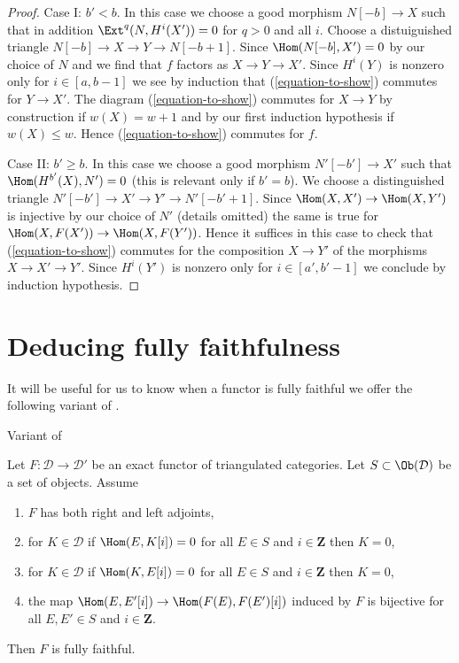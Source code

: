 \begin{proof}
\medskip\noindent
Case I: $b' < b$. In this case we choose a good morphism
$N[-b] \to X$ such that in addition $\Ext^q(N, H^i(X')) = 0$
for $q > 0$ and all $i$. Choose a distuiguished triangle
$N[-b] \to X \to Y \to N[-b + 1]$. Since
$\Hom(N[-b], X') = 0$ by our choice of $N$ and we find that $f$ factors
as $X \to Y \to X'$. Since $H^i(Y)$ is nonzero only for $i \in [a, b - 1]$
we see by induction that (\ref{equation-to-show}) commutes for
$Y \to X'$. The diagram (\ref{equation-to-show}) commutes for
$X \to Y$ by construction if $w(X) = w + 1$ and by our first
induction hypothesis if $w(X) \leq w$.
Hence (\ref{equation-to-show}) commutes for $f$.

\medskip\noindent
Case II: $b' \geq b$. In this case we choose a good morphism
$N'[-b'] \to X'$ such that $\Hom(H^{b'}(X), N') = 0$ (this is
relevant only if $b' = b$). We choose a distinguished triangle
$N'[-b'] \to X' \to Y' \to N'[-b' + 1]$. Since
$\Hom(X, X') \to \Hom(X, Y')$ is injective by our choice of $N'$
(details omitted) the same is true for
$\Hom(X, F(X')) \to \Hom(X, F(Y'))$.
Hence it suffices in this case to check that
(\ref{equation-to-show}) commutes for the composition $X \to Y'$
of the morphisms $X \to X' \to Y'$.
Since $H^i(Y')$ is nonzero only for $i \in [a', b' - 1]$
we conclude by induction hypothesis.
\end{proof}










\section{Deducing fully faithfulness}
\label{section-get-fully-faithful}

\noindent
It will be useful for us to know when a functor is fully faithful
we offer the following variant of \cite[Lemma 2.15]{Orlov-K3}.

\begin{lemma}
\label{lemma-get-fully-faithful}
\begin{reference}
Variant of \cite[Lemma 2.15]{Orlov-K3}
\end{reference}
Let $F : \mathcal{D} \to \mathcal{D}'$ be an exact functor of
triangulated categories. Let $S \subset \Ob(\mathcal{D})$ be
a set of objects. Assume
\begin{enumerate}
\item $F$ has both right and left adjoints,
\item for $K \in \mathcal{D}$ if $\Hom(E, K[i]) = 0$ for all
$E \in S$ and $i \in \mathbf{Z}$ then $K = 0$,
\item for $K \in \mathcal{D}$ if $\Hom(K, E[i]) = 0$ for all
$E \in S$ and $i \in \mathbf{Z}$ then $K = 0$,
\item the map $\Hom(E, E'[i]) \to \Hom(F(E), F(E')[i])$ induced by $F$
is bijective for all $E, E' \in S$ and $i \in \mathbf{Z}$.
\end{enumerate}
Then $F$ is fully faithful.
\end{lemma}

